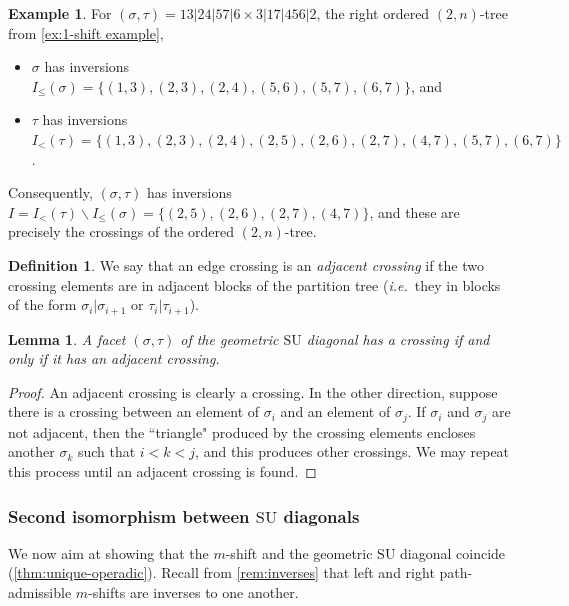 \documentclass{amsart}
\newcommand{\darkblue}{\color{darkblue}} %
\newtheorem{lemma}[theorem]{Lemma}
\theoremstyle{definition}
\newtheorem{definition}[theorem]{Definition}
\newtheorem{example}[theorem]{Example}
\newcommand{\ssm}{\smallsetminus} %
\newcommand{\ie}{\textit{i.e.}~} %
\newcommand{\defn}[1]{\textsl{\darkblue #1}} %
\newcommand{\SU}{\mathrm{SU}}
\begin{document}
\begin{example}
For $(\sigma,\tau) = 13|24|57|6 \times 3|17|456|2$, the right ordered $(2,n)$-tree from \cref{ex:1-shift example},
\begin{itemize}
\item $\sigma$ has inversions $I_{\leq}(\sigma) = \{(1,3),(2,3),(2,4),(5,6),(5,7),(6,7)\}$, and
\item $\tau$ has inversions $I_{<}(\tau) = \{(1,3), (2,3), (2,4), (2,5), (2,6), (2,7), (4,7), (5,7), (6,7)\}$.
\end{itemize}
Consequently, $(\sigma,\tau)$ has inversions $I = I_{<}(\tau) \ssm I_{\leq}(\sigma) = \{(2,5), (2,6), (2,7), (4,7)\}$, and these are precisely the crossings of the ordered $(2,n)$-tree.
\end{example}

\begin{definition}
We say that an edge crossing is an \defn{adjacent crossing} if the two crossing elements are in adjacent blocks of the partition tree (\ie they in blocks of the form $\sigma_i|\sigma_{i+1}$ or $\tau_i|\tau_{i+1}$).
\end{definition}

\begin{lemma}
\label{lem:adjacent-crossing}
A facet $(\sigma,\tau)$ of the geometric $\SU$ diagonal has a crossing if and only if it has an adjacent crossing.
\end{lemma}

\begin{proof}
An adjacent crossing is clearly a crossing. 
In the other direction, suppose there is a crossing between an element of $\sigma_i$ and an element of $\sigma_j$. 
If $\sigma_i$ and $\sigma_j$ are not adjacent, then the ``triangle" produced by the crossing elements encloses another $\sigma_k$ such that $i<k<j$, and this produces other crossings. We may repeat this process until an adjacent crossing is found.
\end{proof}




\subsubsection{Second isomorphism between $\SU$ diagonals}
\label{sec:Iso m-shifts to IJ}

We now aim at showing that the $m$-shift and the geometric $\SU$ diagonal coincide (\cref{thm:unique-operadic}).
Recall from \cref{rem:inverses} that left and right path-admissible $m$-shifts are inverses to one another. 
\end{document}

